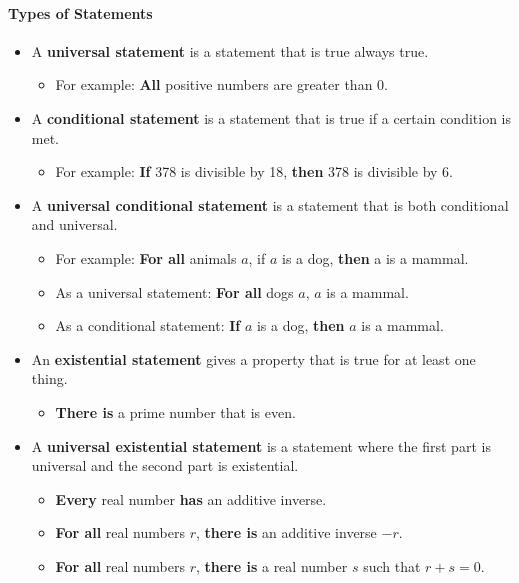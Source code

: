 \paragraph*{Types of Statements}
\begin{itemize}
    \item A \textbf{universal statement} is a statement that is true always true.
    \begin{itemize}
        \item For example: \textbf{All} positive numbers are greater than 0.
    \end{itemize}

    \item A \textbf{conditional statement} is a statement that is true if a certain condition is met.
    \begin{itemize}
        \item For example: \textbf{If} 378 is divisible by 18, \textbf{then} 378 is divisible by 6.
    \end{itemize}

    \item A \textbf{universal conditional statement} is a statement that is both conditional and universal.
    \begin{itemize}
        \item For example: \textbf{For all} animals $a$, if $a$ is a dog, \textbf{then} a is a mammal.
        \item As a universal statement: \textbf{For all} dogs $a$, $a$ is a mammal.
        \item As a conditional statement: \textbf{If} $a$ is a dog, \textbf{then} $a$ is a mammal.
    \end{itemize}

    \item An \textbf{existential statement} gives a property that is true for at least one thing.
    \begin{itemize}
        \item \textbf{There is} a prime number that is even.
    \end{itemize}

    \item A \textbf{universal existential statement} is a statement where the first part is universal and the second part is existential.
    \begin{itemize}
        \item \textbf{Every} real number \textbf{has} an additive inverse.
        \item \textbf{For all} real numbers $r$, \textbf{there is} an additive inverse $-r$.
        \item \textbf{For all} real numbers $r$, \textbf{there is} a real number $s$ such that $r + s = 0$.
    \end{itemize}


\end{itemize}
